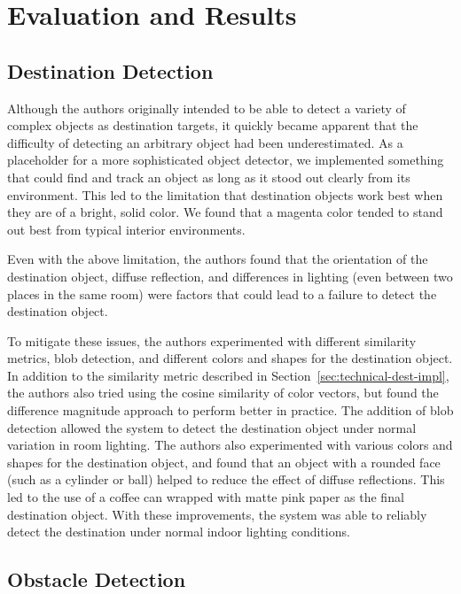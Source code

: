\section{Evaluation and Results}
\label{sec:eval}

\subsection{Destination Detection}
\label{sec:eval-dest}

Although the authors originally intended to be able to detect a variety
of complex objects as destination targets, it quickly became apparent that
the difficulty of detecting an arbitrary object had been underestimated.
As a placeholder for a more sophisticated object detector, we implemented
something that could find and track an object as long as it stood out
clearly from its environment. This led to the limitation that
destination objects work best when they are of a bright, solid color. We found
that a magenta color tended to stand out best from typical interior
environments. 

Even with the above limitation, the authors found that the orientation
of the destination object, diffuse reflection, and differences in lighting
(even between two places in the same room) were factors that could lead
to a failure to detect the destination object. 

To mitigate these issues, the authors experimented with different similarity
metrics, blob detection, and different colors and shapes for the destination
object. In addition to the similarity metric described in 
Section~\ref{sec:technical-dest-impl}, the authors also tried using
the cosine similarity of color vectors, but found the difference magnitude
approach to perform better in practice. The addition of blob detection
allowed the system to detect the destination object under normal variation
in room lighting. The authors also experimented with various colors and
shapes for the destination object, and found that an object with a rounded
face (such as a cylinder or ball) helped to reduce the effect of diffuse
reflections. This led to the use of a coffee can wrapped with matte pink paper
as the final destination object. With these improvements, the system was able 
to reliably detect the destination under normal indoor lighting conditions.

\subsection{Obstacle Detection}
\label{sec:eval-obs}

